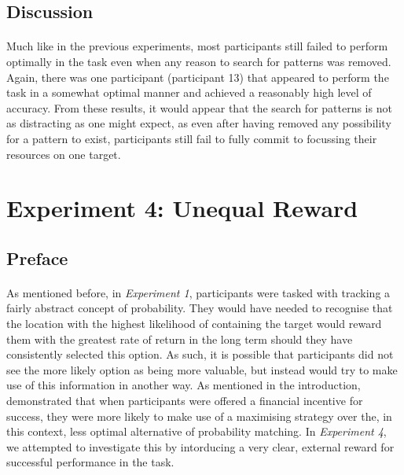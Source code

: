 \documentclass[12pt]{article}
\begin{document}
\subsection*{Discussion}
\paragraph{} Much like in the previous experiments, most participants still failed to perform optimally in the task even when any reason to search for patterns was removed. Again, there was one participant (participant 13) that appeared to perform the task in a somewhat optimal manner and achieved a reasonably high level of accuracy. From these results, it would appear that the search for patterns is not as distracting as one might expect, as even after having removed any possibility for a pattern to exist, participants still fail to fully commit to focussing their resources on one target.


\section*{Experiment 4: Unequal Reward}

\subsection*{Preface}
\paragraph{} As mentioned before, in \textit{Experiment 1}, participants were tasked with tracking a fairly abstract concept of probability. They would have needed to recognise that the location with the highest likelihood of containing the target would reward them with the greatest rate of return in the long term should they have consistently selected this option. As such, it is possible that participants did not see the more likely option as being more valuable, but instead would try to make use of this information in another way. As mentioned in the introduction, \cite{Goodnow1955} demonstrated that when participants were offered a financial incentive for success, they were more likely to make use of a maximising strategy over the, in this context, less optimal alternative of probability matching. In \textit{Experiment 4}, we attempted to investigate this by intorducing a very clear, external reward for successful performance in the task. 
\end{document}
